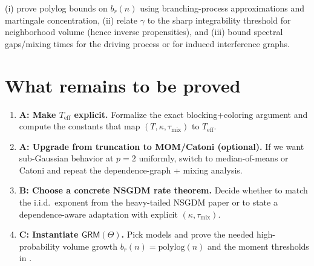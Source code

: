 \documentclass[11pt]{article}
\newcommand{\1}{\mathbf{1}}
\newcommand{\polylog}{\mathrm{polylog}}
\theoremstyle{plain}
\theoremstyle{definition}
\theoremstyle{remark}
\begin{document}
(i) prove polylog bounds on $b_r(n)$ using branching-process approximations and martingale concentration,
(ii) relate $\gamma$ to the sharp integrability threshold for neighborhood volume (hence inverse propensities),
and (iii) bound spectral gaps/mixing times for the driving process or for induced interference graphs.

\section{What remains to be proved}
\label{sec:todo}

\begin{enumerate}[leftmargin=2em]
\item \textbf{A: Make $T_{\mathrm{eff}}$ explicit.} Formalize the exact blocking+coloring argument
and compute the constants that map $(T,\kappa,\tau_{\mathrm{mix}})$ to $T_{\mathrm{eff}}$.
\item \textbf{A: Upgrade from truncation to MOM/Catoni (optional).} If we want sub-Gaussian behavior at $p=2$ uniformly,
switch to median-of-means or Catoni and repeat the dependence-graph + mixing analysis.
\item \textbf{B: Choose a concrete NSGDM rate theorem.} Decide whether to match the i.i.d.\ exponent from the heavy-tailed NSGDM paper
or to state a dependence-aware adaptation with explicit $(\kappa,\tau_{\mathrm{mix}})$.
\item \textbf{C: Instantiate $\mathsf{GRM}(\Theta)$.} Pick models and prove the needed high-probability volume growth $b_r(n)=\polylog(n)$ and the moment thresholds in .
\end{enumerate}









\end{document}
